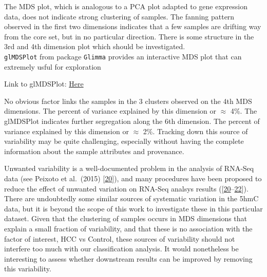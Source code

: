 \documentclass[
]{book}
\newenvironment{Shaded}{\begin{snugshade}}{\end{snugshade}}
\newcommand{\CommentTok}[1]{\textcolor[rgb]{0.56,0.35,0.01}{\textit{#1}}}
\newcommand{\DataTypeTok}[1]{\textcolor[rgb]{0.13,0.29,0.53}{#1}}
\newcommand{\KeywordTok}[1]{\textcolor[rgb]{0.13,0.29,0.53}{\textbf{#1}}}
\newcommand{\NormalTok}[1]{#1}
\newcommand{\OperatorTok}[1]{\textcolor[rgb]{0.81,0.36,0.00}{\textbf{#1}}}
\newcommand{\StringTok}[1]{\textcolor[rgb]{0.31,0.60,0.02}{#1}}
\begin{document}
The MDS plot, which is analogous to a PCA plot adapted to gene expression data,
does not indicate strong clustering of samples. The fanning pattern observed in the
first two dimensions indicates that a few samples are drifting way from the
core set, but in no particular direction. There is some structure in the
3rd and 4th dimension plot which should be investigated.\\
\texttt{glMDSPlot} from package \texttt{Glimma} provides an interactive MDS
plot that can extremely usful for exploration

\begin{Shaded}
\end{Shaded}

Link to glMDSPlot:
\href{Static/figures//GlMDSplot.html}{Here}

No obvious factor links the samples in the 3 clusters observed on the
4th MDS dimensions. The percent of variance explained by this dimension or
\(\approx\) 4\%. The glMDSPlot indicates further segregation along
the 6th dimension. The percent of variance explained by this dimension or
\(\approx\) 2\%. Tracking down this source of variability may be quite challenging,
especially without having the complete information about the sample attributes
and provenance.

Unwanted variability is a well-documented problem in the analysis of RNA-Seq data
(see Peixoto et al.~(2015) {[}\protect\hyperlink{ref-Peixoto:2015aa}{20}{]}), and many procedures have been proposed
to reduce the effect of unwanted variation on RNA-Seq analsys results
({[}\protect\hyperlink{ref-Peixoto:2015aa}{20}--\protect\hyperlink{ref-Risso:2014aa}{22}{]}). There are undoubtedly
some similar sources of systematic variation in the 5hmC data, but it is
beyond the scope of this work to investigate these in this particular dataset.
Given that the clustering of samples occurs in MDS dimensions that explain
a small fraction of variability, and that these is no association with the
factor of interest, HCC vs Control, these sources of variability should not
interfere too much with our classification analysis. It would nonetheless be interesting
to assess whether downstream results can be improved by removing this variability.
\end{document}
